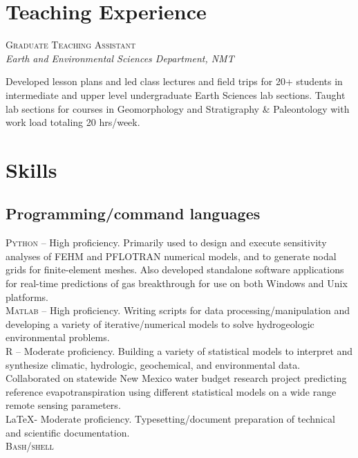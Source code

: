 \documentclass[11pt, letterpaper]{article}
\newcommand{\years}[1]{\marginnote{\scriptsize #1}}
\begin{document}
\section*{Teaching Experience}
\noindent
\years{2015 - 2016}\textsc{Graduate Teaching Assistant}\\
\textit{Earth and Environmental Sciences Department, NMT}
\begin{adjustwidth}{5pt}{0pt}
	Developed lesson plans and led class lectures and field trips for 20+ students in intermediate and upper level undergraduate Earth Sciences lab sections. Taught lab sections for courses in Geomorphology and Stratigraphy \& Paleontology with work load totaling 20 hrs/week.  
\end{adjustwidth}

\section*{Skills}
\subsection*{Programming/command languages}
\noindent
\textsc{Python} – High proficiency. Primarily used to design and execute sensitivity analyses of FEHM and PFLOTRAN numerical models, and to generate nodal grids for finite-element meshes. Also developed standalone software applications for real-time predictions of gas breakthrough for use on both Windows and Unix platforms.\\[5pt]
\textsc{Matlab} – High proficiency. Writing scripts for data processing/manipulation and developing a variety of iterative/numerical models to solve hydrogeologic environmental problems.\\[5pt]
\textsc{R} – Moderate proficiency. Building a variety of statistical models to interpret and synthesize climatic, hydrologic, geochemical, and environmental data. Collaborated on statewide New Mexico water budget research project predicting reference evapotranspiration using different statistical models on a wide range remote sensing parameters.\\[5pt]
\LaTeX - Moderate proficiency. Typesetting/document preparation of technical and scientific documentation. \\[5pt]
\textsc{Bash/shell}
\end{document}
